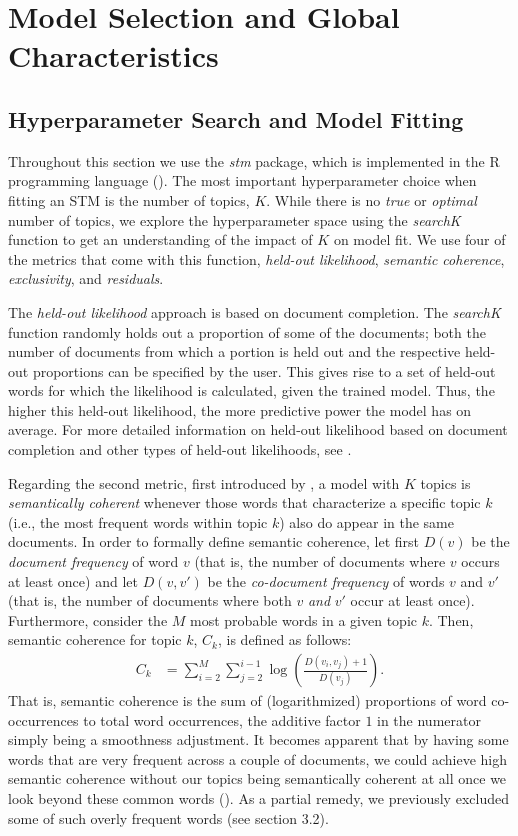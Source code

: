 \documentclass[12pt]{article}
\begin{document}
\section{Model Selection and Global Characteristics}

\subsection{Hyperparameter Search and Model Fitting}

Throughout this section we use the \textit{stm} package, which is implemented in the R programming language (\citealp{stm}). The most important hyperparameter choice when fitting an STM is the number of topics, $K$. While there is no \textit{true} or \textit{optimal} number of topics, we explore the hyperparameter space using the \textit{searchK} function to get an understanding of the impact of $K$ on model fit. We use four of the metrics that come with this function, \textit{held-out likelihood}, \textit{semantic coherence}, \textit{exclusivity}, and \textit{residuals}.

The \textit{held-out likelihood} approach is based on document completion. The \textit{searchK} function randomly holds out a proportion of some of the documents; both the number of documents from which a portion is held out and the respective held-out proportions can be specified by the user. This gives rise to a set of held-out words for which the likelihood is calculated, given the trained model. Thus, the higher this held-out likelihood, the more predictive power the model has on average. For more detailed information on held-out likelihood based on document completion and other types of held-out likelihoods, see \cite{wallach2009evaluation}.

Regarding the second metric, first introduced by \cite{mimno2011optimizing}, a model with $K$ topics is \textit{semantically coherent} whenever those words that characterize a specific topic $k$ (i.e., the most frequent words within topic $k$) also do appear in the same documents. In order to formally define semantic coherence, let first $D(v)$ be the \textit{document frequency} of word $v$ (that is, the number of documents where $v$ occurs at least once) and let $D(v, v')$ be the \textit{co-document frequency} of words $v$ and $v'$ (that is, the number of documents where both $v$ \textit{and} $v'$ occur at least once). Furthermore, consider the $M$ most probable words in a given topic $k$. Then, semantic coherence for topic $k$, $C_{k}$, is defined as follows:
\begin{align*}
C_{k} &= \sum_{i=2}^{M}\sum_{j=2}^{i-1}\log(\frac{D(v_{i}, v_{j})+1}{D(v_{j})}).
\end{align*}
That is, semantic coherence is the sum of (logarithmized) proportions of word co-occurrences to total word occurrences, the additive factor $1$ in the numerator simply being a smoothness adjustment. It becomes apparent that by having some words that are very frequent across a couple of documents, we could achieve high semantic coherence without our topics being semantically coherent at all once we look beyond these common words (\citealp{stm, mimno2011optimizing}). As a partial remedy, we previously excluded some of such overly frequent words (see section 3.2).
\end{document}
